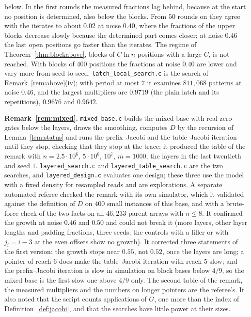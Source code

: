 \documentclass[11pt]{amsart}
\theoremstyle{definition}
\theoremstyle{remark}
\begin{document}
below. In the first rounds the measured fractions lag behind, because at the start no position
is determined, also below the blocks. From $50$ rounds on they agree with the iterates to about
$0.02$ at noise $0.40$, where the fractions of the upper blocks decrease slowly because the
determined part comes closer; at noise $0.46$ the last open positions go faster than the
iterates. The regime of Theorem~\ref{thm:blockabove}, blocks of $C\ln n$ positions with a large
$C$, is not reached. With blocks of $400$ positions the fractions at noise $0.40$ are lower and
vary more from seed to seed. \texttt{latch\_local\_search.c} is the search of
Remark~\ref{rem:above}(iv); with period at most $7$ it examines $811{,}068$ patterns at noise
$0.46$, and the largest multipliers are $0.9719$ (the plain latch and its repetitions), $0.9676$
and $0.9642$.

\medskip\noindent\textbf{Remark~\ref{rem:mixed}.} \texttt{mixed\_base.c} builds the mixed base
with real zero gates below the layers, draws the smoothing, computes $D$ by the recursion of
Lemma~\ref{lem:status} and runs the prefix--Jacobi and the table--Jacobi iteration until they
stop, checking that they stop at the trace; it produced the table of the remark with
$n=2.5\cdot10^6$, $5\cdot10^6$, $10^7$, $m=1000$, the layers in the last twentieth and seed $1$.
\texttt{layered\_search.c} and \texttt{layered\_table\_search.c} are the two searches, and
\texttt{layered\_design.c} evaluates one design; these three use the model with a fixed density
for resampled reads and are explorations. A separate automated referee checked the remark with
its own simulator, which it validated against the definition of $D$ on $400$ small instances of
this base, and with a brute-force check of the two facts on all $46{,}233$ parent arrays with
$n\le8$. It confirmed the growth at noise $0.46$ and $0.50$ and could not break it (more layers,
other layer lengths and padding fractions, three seeds; the controls with a filler or with
$j_i=i-3$ at the even offsets show no growth). It corrected three statements of the first
version: the growth stops near $0.55$, not $0.52$, once the layers are long; a pointer of reach
$6$ does make the table--Jacobi iteration with reach $5$ slow; and the prefix--Jacobi iteration
is slow in simulation on block bases below $4/9$, so the mixed base is the first slow one above
$4/9$ only. The second table of the remark, the measured multipliers and the numbers on longer
pointers are the referee's. It also noted that the script counts applications of $G$, one more
than the index of Definition~\ref{def:jacobi}, and that the searches have little power at their
sizes.
\end{document}
